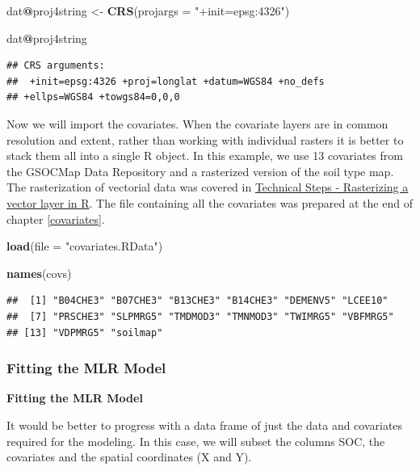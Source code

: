 \documentclass[10pt,b5paper,]{book}
\newenvironment{Shaded}{\begin{snugshade}}{\end{snugshade}}
\newcommand{\DataTypeTok}[1]{\textcolor[rgb]{0.13,0.29,0.53}{#1}}
\newcommand{\KeywordTok}[1]{\textcolor[rgb]{0.13,0.29,0.53}{\textbf{#1}}}
\newcommand{\NormalTok}[1]{#1}
\newcommand{\OperatorTok}[1]{\textcolor[rgb]{0.81,0.36,0.00}{\textbf{#1}}}
\newcommand{\StringTok}[1]{\textcolor[rgb]{0.31,0.60,0.02}{#1}}
\theoremstyle{definition}
\theoremstyle{definition}
\theoremstyle{definition}
\theoremstyle{remark}
\begin{document}
\begin{Shaded}
\begin{Highlighting}[]
\NormalTok{dat}\OperatorTok{@}\NormalTok{proj4string <-}\StringTok{ }\KeywordTok{CRS}\NormalTok{(}\DataTypeTok{projargs =} \StringTok{"+init=epsg:4326"}\NormalTok{)}

\NormalTok{dat}\OperatorTok{@}\NormalTok{proj4string}
\end{Highlighting}
\end{Shaded}

\begin{verbatim}
## CRS arguments:
##  +init=epsg:4326 +proj=longlat +datum=WGS84 +no_defs
## +ellps=WGS84 +towgs84=0,0,0
\end{verbatim}

Now we will import the covariates. When the covariate layers are in
common resolution and extent, rather than working with individual
rasters it is better to stack them all into a single R object. In this
example, we use 13 covariates from the GSOCMap Data Repository and a
rasterized version of the soil type map. The rasterization of vectorial
data was covered in
\protect\hyperlink{technical-steps---rasterizing-a-vector-layer-in-r}{Technical
Steps - Rasterizing a vector layer in R}. The file containing all the
covariates was prepared at the end of chapter \ref{covariates}.

\begin{Shaded}
\begin{Highlighting}[]
\KeywordTok{load}\NormalTok{(}\DataTypeTok{file =} \StringTok{"covariates.RData"}\NormalTok{)}

\KeywordTok{names}\NormalTok{(covs)}
\end{Highlighting}
\end{Shaded}

\begin{verbatim}
##  [1] "B04CHE3" "B07CHE3" "B13CHE3" "B14CHE3" "DEMENV5" "LCEE10" 
##  [7] "PRSCHE3" "SLPMRG5" "TMDMOD3" "TMNMOD3" "TWIMRG5" "VBFMRG5"
## [13] "VDPMRG5" "soilmap"
\end{verbatim}

\hypertarget{fitting-the-mlr-model}{%
\subsubsection{Fitting the MLR Model}\label{fitting-the-mlr-model}}

\textbf{Fitting the MLR Model}

It would be better to progress with a data frame of just the data and
covariates required for the modeling. In this case, we will subset the
columns SOC, the covariates and the spatial coordinates (X and Y).
\end{document}

